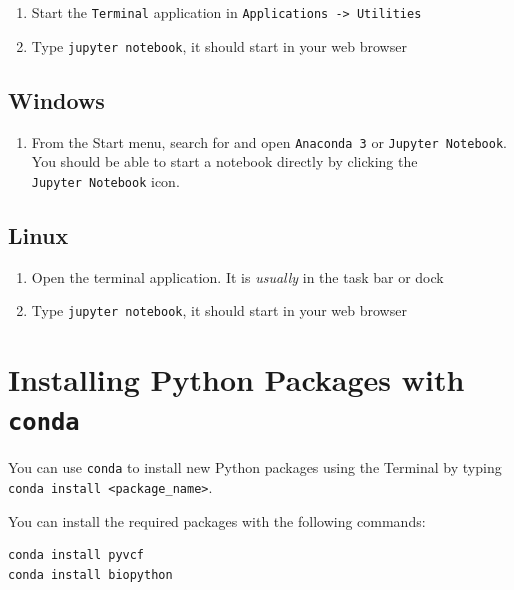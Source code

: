 \documentclass[]{book}
\providecommand{\tightlist}{%
  \setlength{\itemsep}{0pt}\setlength{\parskip}{0pt}}
\theoremstyle{definition}
\theoremstyle{definition}
\theoremstyle{definition}
\theoremstyle{remark}
\begin{document}
\begin{enumerate}
\def\labelenumi{\arabic{enumi}.}
\tightlist
\item
  Start the \texttt{Terminal} application in
  \texttt{Applications\ -\textgreater{}\ Utilities}
\item
  Type \texttt{jupyter\ notebook}, it should start in your web browser
\end{enumerate}

\hypertarget{windows}{%
\subsection{Windows}\label{windows}}

\begin{enumerate}
\def\labelenumi{\arabic{enumi}.}
\tightlist
\item
  From the Start menu, search for and open \texttt{Anaconda\ 3} or
  \texttt{Jupyter\ Notebook}. You should be able to start a notebook
  directly by clicking the \texttt{Jupyter\ Notebook} icon.
\end{enumerate}

\hypertarget{linux}{%
\subsection{Linux}\label{linux}}

\begin{enumerate}
\def\labelenumi{\arabic{enumi}.}
\tightlist
\item
  Open the terminal application. It is \emph{usually} in the task bar or
  dock
\item
  Type \texttt{jupyter\ notebook}, it should start in your web browser
\end{enumerate}

\hypertarget{installing-python-packages-with-conda}{%
\section{\texorpdfstring{Installing Python Packages with
\texttt{conda}}{Installing Python Packages with conda}}\label{installing-python-packages-with-conda}}

You can use \texttt{conda} to install new Python packages using the
Terminal by typing
\texttt{conda\ install\ \textless{}package\_name\textgreater{}}.

You can install the required packages with the following commands:

\begin{verbatim}
conda install pyvcf
conda install biopython
\end{verbatim}
\end{document}
